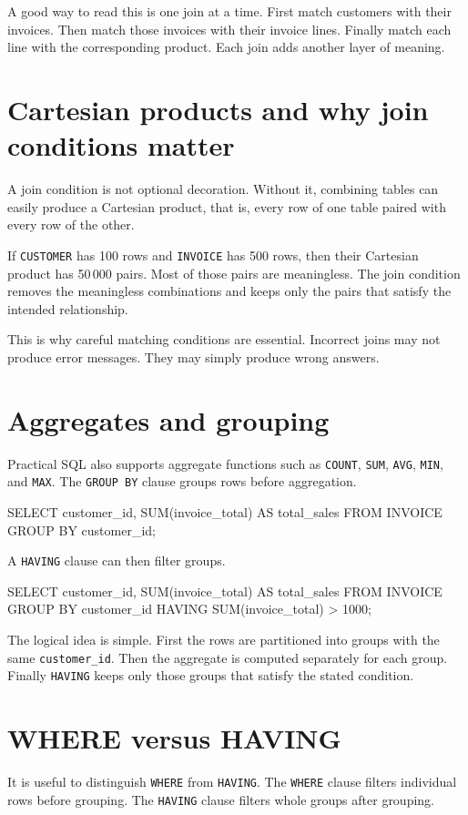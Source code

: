 \documentclass[11pt,a4paper,openany]{book}
\begin{document}
A good way to read this is one join at a time. First match customers with their invoices. Then match those invoices with their invoice lines. Finally match each line with the corresponding product. Each join adds another layer of meaning.

\section{Cartesian products and why join conditions matter}
A join condition is not optional decoration. Without it, combining tables can easily produce a Cartesian product, that is, every row of one table paired with every row of the other.

If \texttt{CUSTOMER} has 100 rows and \texttt{INVOICE} has 500 rows, then their Cartesian product has 50\,000 pairs. Most of those pairs are meaningless. The join condition removes the meaningless combinations and keeps only the pairs that satisfy the intended relationship.

This is why careful matching conditions are essential. Incorrect joins may not produce error messages. They may simply produce wrong answers.

\section{Aggregates and grouping}
Practical SQL also supports aggregate functions such as \texttt{COUNT}, \texttt{SUM}, \texttt{AVG}, \texttt{MIN}, and \texttt{MAX}. The \texttt{GROUP BY} clause groups rows before aggregation.

\begin{codesql}
SELECT customer_id, SUM(invoice_total) AS total_sales
FROM INVOICE
GROUP BY customer_id;
\end{codesql}

A \texttt{HAVING} clause can then filter groups.

\begin{codesql}
SELECT customer_id, SUM(invoice_total) AS total_sales
FROM INVOICE
GROUP BY customer_id
HAVING SUM(invoice_total) > 1000;
\end{codesql}

The logical idea is simple. First the rows are partitioned into groups with the same \texttt{customer\_id}. Then the aggregate is computed separately for each group. Finally \texttt{HAVING} keeps only those groups that satisfy the stated condition.

\section{WHERE versus HAVING}
It is useful to distinguish \texttt{WHERE} from \texttt{HAVING}. The \texttt{WHERE} clause filters individual rows before grouping. The \texttt{HAVING} clause filters whole groups after grouping.
\end{document}
